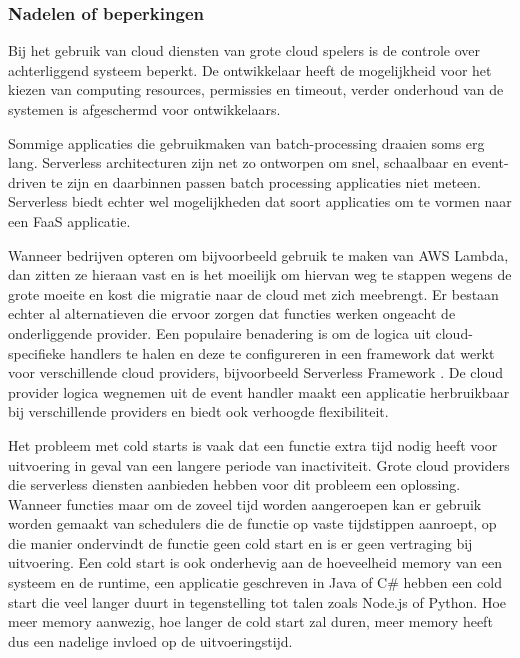 \subsubsection{Nadelen of beperkingen}

\begin{description}[style=unboxed, labelwidth=\linewidth, listparindent =0pt]
    \item[Geen controle over infrastructuur]
    Bij het gebruik van cloud diensten van grote cloud spelers is de controle over achterliggend systeem beperkt. De ontwikkelaar heeft de mogelijkheid voor het kiezen van computing resources, permissies en timeout, verder onderhoud van de systemen is afgeschermd voor ontwikkelaars.
    \newline
    
    \item[Server applicatie die lang draait]
    Sommige applicaties die gebruikmaken van batch-processing draaien soms erg lang. Serverless architecturen zijn net zo ontworpen om snel, schaalbaar en event-driven te zijn en daarbinnen passen batch processing applicaties niet meteen. Serverless biedt echter wel mogelijkheden dat soort applicaties om te vormen naar een FaaS applicatie.
    \newline
    
     \item[Vendor lock-in]
     Wanneer bedrijven opteren om bijvoorbeeld gebruik te maken van AWS Lambda, dan zitten ze hieraan vast en is het moeilijk om hiervan weg te stappen wegens de grote moeite en kost die migratie naar de cloud met zich meebrengt. Er bestaan echter al alternatieven die ervoor zorgen dat functies werken ongeacht de onderliggende provider. Een populaire benadering is om de logica uit cloud-specifieke handlers te halen en deze te configureren in een framework dat werkt voor verschillende cloud providers, bijvoorbeeld Serverless Framework \autocite{Serverless2018}. De cloud provider logica wegnemen uit de event handler maakt een applicatie herbruikbaar bij verschillende providers en biedt ook verhoogde flexibiliteit.
     \newline
     
     \item[Cold start]
     Het probleem met cold starts is vaak dat een functie extra tijd nodig heeft voor uitvoering in geval van een langere periode van inactiviteit. Grote cloud providers die serverless diensten aanbieden hebben voor dit probleem een oplossing. Wanneer functies maar om de zoveel tijd worden aangeroepen kan er gebruik worden gemaakt van schedulers die de functie op vaste tijdstippen aanroept, op die manier ondervindt de functie geen cold start en is er geen vertraging bij uitvoering. Een cold start is ook onderhevig aan de hoeveelheid memory van een systeem en de runtime, een applicatie geschreven in Java of C\# hebben een cold start die veel langer duurt in tegenstelling tot talen zoals Node.js  of Python.  Hoe meer memory aanwezig, hoe langer de cold start zal duren, meer memory heeft dus een nadelige invloed op de uitvoeringstijd.
\end{description}

